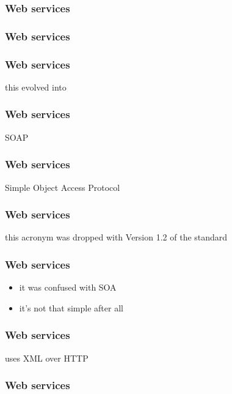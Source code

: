\begin{frame}[fragile]
  \frametitle{Web services}
  \tiny 
\end{frame}

\begin{frame}[fragile]
  \frametitle{Web services}
  \tiny 
\end{frame}

\begin{frame}
  \frametitle{Web services}
  \begin{center}
    this evolved into
  \end{center}
\end{frame}

\begin{frame}
  \frametitle{Web services}
  \begin{center}
    SOAP
  \end{center}
\end{frame}

\begin{frame}
  \frametitle{Web services}
  \begin{center}
    \alert{Simple} Object Access Protocol
  \end{center}
\end{frame}

\begin{frame}
  \frametitle{Web services}
  \begin{center}
    this acronym was dropped with Version 1.2 of the standard
  \end{center}
\end{frame}

\begin{frame}
  \frametitle{Web services}
  \begin{itemize}
  \item it was confused with SOA
  \item it’s not that simple after all
  \end{itemize}
\end{frame}

\begin{frame}
  \frametitle{Web services}
  \begin{center}
    uses XML over HTTP
  \end{center}
\end{frame}

\begin{frame}[fragile]
  \frametitle{Web services}
  \tiny 
\end{frame}


